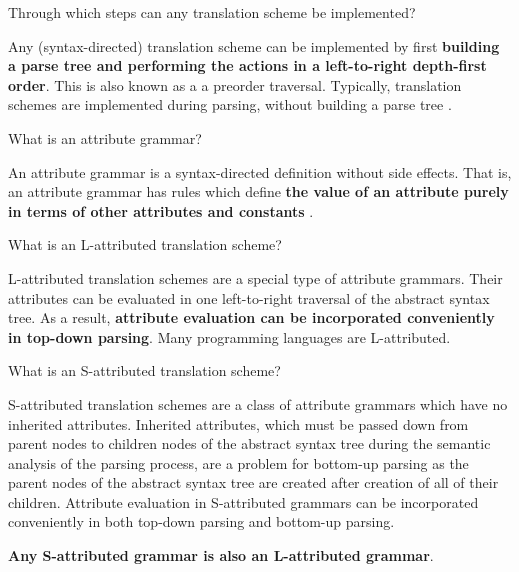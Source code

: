 \begin{Exercise}
Through which steps can any translation scheme be implemented?
\end{Exercise}
\begin{Answer}
Any (syntax-directed) translation scheme can be implemented by first \textbf{building a parse tree and performing the actions in a left-to-right depth-first order}. This is also known as a a preorder traversal.
Typically, translation schemes are implemented during parsing, without building a parse tree \cite[p.~324]{compilers-aho-2007}.
\end{Answer}

\begin{Exercise}
What is an attribute grammar?
\end{Exercise}
\begin{Answer}
An attribute grammar is a syntax-directed definition without side effects.
That is, an attribute grammar has rules which define \textbf{the value of an attribute purely in terms of other attributes and constants} \cite[p.~306]{compilers-aho-2007}.
\end{Answer}

\begin{Exercise}
What is an L-attributed translation scheme?
\end{Exercise}
\begin{Answer}
L-attributed translation schemes are a special type of attribute grammars.
Their attributes can be evaluated in one left-to-right traversal of the abstract syntax tree.
As a result, \textbf{attribute evaluation can be incorporated conveniently in top-down parsing}.
Many programming languages are L-attributed.
\end{Answer}

\begin{Exercise}
What is an S-attributed translation scheme?
\end{Exercise}
\begin{Answer}
S-attributed translation schemes are a class of attribute grammars which have no inherited attributes.
Inherited attributes, which must be passed down from parent nodes to children nodes of the abstract syntax tree during the semantic analysis of the parsing process, are a problem for bottom-up parsing as the parent nodes of the abstract syntax tree are created after creation of all of their children.
Attribute evaluation in S-attributed grammars can be incorporated conveniently in both top-down parsing and bottom-up parsing.

\textbf{Any S-attributed grammar is also an L-attributed grammar}.
\end{Answer}

